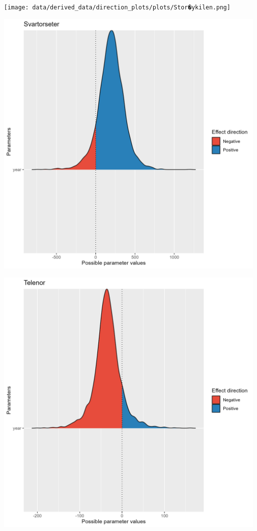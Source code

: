 \documentclass[
  letterpaper,
  DIV=11,
  numbers=noendperiod]{scrreport}
\begin{document}
\texttt{[image: data/derived\_data/direction\_plots/plots/Stor�ykilen.png]}

\includegraphics{data/derived_data/direction_plots/plots/Svartorseter.png}

\includegraphics{data/derived_data/direction_plots/plots/Telenor.png}
\end{document}
